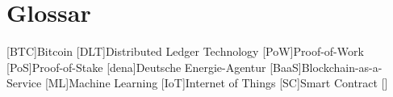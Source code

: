 \section*{Glossar}            %
\begin{acronym}[BaaS]
	[BTC]{Bitcoin}
	[DLT]{Distributed Ledger Technology}
	[PoW]{Proof-of-Work}
	[PoS]{Proof-of-Stake}
	[dena]{Deutsche Energie-Agentur}
	[BaaS]{Blockchain-as-a-Service}
	[ML]{Machine Learning}
	[IoT]{Internet of Things}
	[SC]{Smart Contract}
	\acro{}[]{}
\end{acronym}

\listoffigures
{}
\newpage

